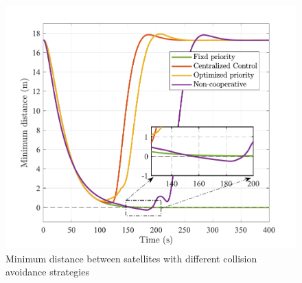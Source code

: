 \documentclass{ifacconf}
\begin{document}
\begin{figure}[!t]
   \begin{center}
      \newcommand{\upperClip}{30bp}
      \newcommand{\lowerClip}{8bp}
      \newcommand{\leftClip}{10bp}
      \newcommand{\rightClip}{10bp}
      \includegraphics[width=1.0\linewidth, trim = \leftClip{} \lowerClip{} \rightClip{} \upperClip{}, clip]{minDistance.pdf} 
      \caption{Minimum distance between satellites with different collision avoidance strategies} 
      \label{fig:minDistance}
   \end{center}
\end{figure}
\end{document}

